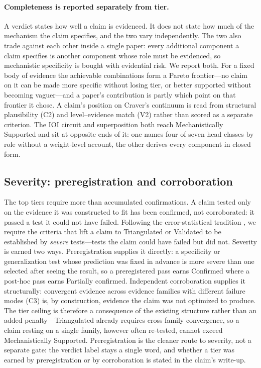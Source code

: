 \documentclass{article}
\begin{document}
\paragraph{Completeness is reported separately from tier.} A verdict states how well a claim is evidenced. It does not state how much of the mechanism the claim specifies, and the two vary independently. The two also trade against each other inside a single paper: every additional component a claim specifies is another component whose role must be evidenced, so mechanistic specificity is bought with evidential risk. We report both. For a fixed body of evidence the achievable combinations form a Pareto frontier---no claim on it can be made more specific without losing tier, or better supported without becoming vaguer---and a paper's contribution is partly which point on that frontier it chose. A claim's position on Craver's continuum is read from structural plausibility (C2) and level--evidence match (V2) rather than scored as a separate criterion. The IOI circuit and superposition both reach Mechanistically Supported and sit at opposite ends of it: one names four of seven head classes by role without a weight-level account, the other derives every component in closed form.

\subsection{Severity: preregistration and corroboration}
\label{sec:severity}

The top tiers require more than accumulated confirmations. A claim tested only on the evidence it was constructed to fit has been confirmed, not corroborated: it passed a test it could not have failed. Following the error-statistical tradition \citep{mayo2018statistical}, we require the criteria that lift a claim to Triangulated or Validated to be established by \emph{severe} tests---tests the claim could have failed but did not. Severity is earned two ways. Preregistration supplies it directly: a specificity or generalization test whose prediction was fixed in advance is more severe than one selected after seeing the result, so a preregistered pass earns Confirmed where a post-hoc pass earns Partially confirmed. Independent corroboration supplies it structurally: convergent evidence across evidence families with different failure modes (C3) is, by construction, evidence the claim was not optimized to produce. The tier ceiling is therefore a consequence of the existing structure rather than an added penalty---Triangulated already requires cross-family convergence, so a claim resting on a single family, however often re-tested, cannot exceed Mechanistically Supported. Preregistration is the cleaner route to severity, not a separate gate: the verdict label stays a single word, and whether a tier was earned by preregistration or by corroboration is stated in the claim's write-up.
\end{document}
